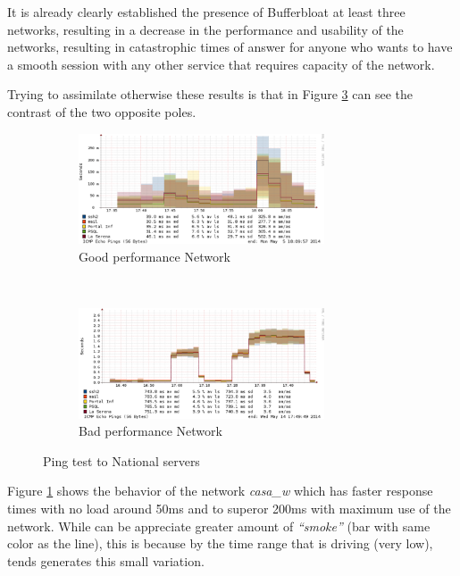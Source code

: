 It is already clearly established the presence of Bufferbloat at least three
networks, resulting in a decrease in the performance and usability of the
networks, resulting in catastrophic times of answer for anyone who wants to
have a smooth session with any other service that requires capacity of the
network.

Trying to assimilate otherwise these results is that in Figure
\ref{fig:smokenat} can see the contrast of the two opposite poles.

\begin{figure}
\begin{subfigure}{\textwidth}
  \centering
    \includegraphics[width=0.8\textwidth]{img/smoke_nat_good}
\caption[Smokeping: Ping test to National servers with good performance]{Good performance Network}
\label{fig:smokenatgood}
\end{subfigure}%
\\
\begin{subfigure}{\textwidth}
\centering
    \includegraphics[width=0.8\textwidth]{img/smoke_nat_bad}
\caption[Smokeping: Ping test to National servers with bad performance]{Bad performance Network}
\label{fig:smokenatbad}
\end{subfigure}
\caption[Smokeping: Ping test to National servers]{Ping test to National servers}
\label{fig:smokenat}
\end{figure}

Figure \ref{fig:smokenatgood} shows the behavior of the network
\textit{casa\_w} which has faster response times with  no load around 50ms and
to superor  200ms with maximum use of the network. While can be appreciate
greater amount of \textit{``smoke''} (bar with same color as the line), this
is because by the time range that is driving (very low), tends generates this
small variation.

